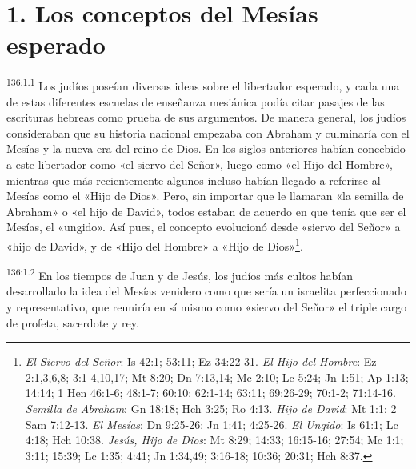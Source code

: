 \section*{1. Los conceptos del Mesías esperado}
\par 
\textsuperscript{136:1.1} Los judíos poseían diversas ideas sobre el libertador esperado, y cada una de estas diferentes escuelas de enseñanza mesiánica podía citar pasajes de las escrituras hebreas como prueba de sus argumentos. De manera general, los judíos consideraban que su historia nacional empezaba con Abraham y culminaría con el Mesías y la nueva era del reino de Dios. En los siglos anteriores habían concebido a este libertador como «el siervo del Señor», luego como «el Hijo del Hombre», mientras que más recientemente algunos incluso habían llegado a referirse al Mesías como el «Hijo de Dios». Pero, sin importar que le llamaran «la semilla de Abraham» o «el hijo de David», todos estaban de acuerdo en que tenía que ser el Mesías, el «ungido». Así pues, el concepto evolucionó desde «siervo del Señor» a «hijo de David», y de «Hijo del Hombre» a «Hijo de Dios»\footnote{\textit{El Siervo del Señor}: Is 42:1; 53:11; Ez 34:22-31. \textit{El Hijo del Hombre}: Ez 2:1,3,6,8; 3:1-4,10,17; Mt 8:20; Dn 7:13,14; Mc 2:10; Lc 5:24; Jn 1:51; Ap 1:13; 14:14; 1 Hen 46:1-6; 48:1-7; 60:10; 62:1-14; 63:11; 69:26-29; 70:1-2; 71:14-16. \textit{Semilla de Abraham}: Gn 18:18; Hch 3:25; Ro 4:13. \textit{Hijo de David}: Mt 1:1; 2 Sam 7:12-13. \textit{El Mesías}: Dn 9:25-26; Jn 1:41; 4:25-26. \textit{El Ungido}: Is 61:1; Lc 4:18; Hch 10:38. \textit{Jesús, Hijo de Dios}: Mt 8:29; 14:33; 16:15-16; 27:54; Mc 1:1; 3:11; 15:39; Lc 1:35; 4:41; Jn 1:34,49; 3:16-18; 10:36; 20:31; Hch 8:37.}.

\par 
\textsuperscript{136:1.2} En los tiempos de Juan y de Jesús, los judíos más cultos habían desarrollado la idea del Mesías venidero como que sería un israelita perfeccionado y representativo, que reuniría en sí mismo como «siervo del Señor» el triple cargo de profeta, sacerdote y rey.

